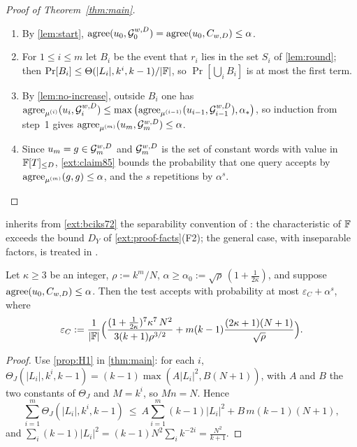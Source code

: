 \begin{proof}[Proof of Theorem~\ref{thm:main}]
\begin{enumerate}
\item By \cref{lem:start}, $\mathrm{agree}(u_0,\mathcal{G}_0^{w,D})=\mathrm{agree}(u_0,C_{w,D})\le\alpha$.
\item For $1\le i\le m$ let $B_i$ be the event that $r_i$ lies in the set $S_i$ of
\cref{lem:round}; then $\Pr[B_i]\le\Theta(|L_i|,k^i,k-1)/|\mathbb{F}|$, so $\Pr[\bigcup_iB_i]$ is at most
the first term.
\item By \cref{lem:no-increase}, outside $B_i$ one has
$\mathrm{agree}_{\mu^{(i)}}(u_i,\mathcal{G}_i^{w,D})\le\max\big(\mathrm{agree}_{\mu^{(i-1)}}(u_{i-1},\mathcal{G}_{i-1}^{w,D}),\alpha_*\big)$,
so induction from step~1 gives $\mathrm{agree}_{\mu^{(m)}}(u_m,\mathcal{G}_m^{w,D})\le\alpha$.
\item Since $u_m=g\in\mathcal{G}_m^{w,D}$ and $\mathcal{G}_m^{w,D}$ is the set of constant words with value in
$\mathbb{F}[T]_{\le D}$, \cref{ext:claim85} bounds the probability that one query accepts by
$\mathrm{agree}_{\mu^{(m)}}(g,g)\le\alpha$, and the $s$ repetitions by $\alpha^s$.
\end{enumerate}
\end{proof}

\begin{remark}[Characteristic]\label{rem:char}
 inherits from \cref{ext:bciks72} the separability convention of
\cite[\S5.2.3]{BCIKS20}: the characteristic of $\mathbb{F}$ exceeds the bound $D_Y$ of
\cref{ext:proof-facts}(F2);
the general case, with inseparable factors, is treated in \cite[Appendix~C]{BCIKS20}.
\end{remark}

\begin{corollary}\label{cor:johnson}
Let $\kappa\ge3$ be an integer, $\rho:=k^m/N$, $\alpha\ge\alpha_0:=\sqrt\rho\,(1+\frac1{2\kappa})$, and
suppose $\mathrm{agree}(u_0,C_{w,D})\le\alpha$. Then the test accepts with probability at most
$\varepsilon_C+\alpha^s$, where
\[
\varepsilon_C:=\frac1{|\mathbb{F}|}\Big(\frac{(1+\frac1{2\kappa})^7\kappa^7\,N^2}{3(k+1)\rho^{3/2}}
+m(k-1)\frac{(2\kappa+1)(N+1)}{\sqrt\rho}\Big).
\]
\end{corollary}

\begin{proof}
Use \cref{prop:H1} in \cref{thm:main}: for each $i$,
$\Theta_J(|L_i|,k^i,k-1)=(k-1)\max(A|L_i|^2,B(N+1))$, with $A$ and $B$ the two constants of
$\Theta_J$ and $M=k^i$, so $Mn=N$. Hence
\[
\sum_{i=1}^{m}\Theta_J(|L_i|,k^i,k-1)\ \le\ A\sum_{i=1}^{m}(k-1)|L_i|^2+B\,m(k-1)(N+1),
\]
and $\sum_i(k-1)|L_i|^2=(k-1)N^2\sum_ik^{-2i}=\frac{N^2}{k+1}$.
\end{proof}

